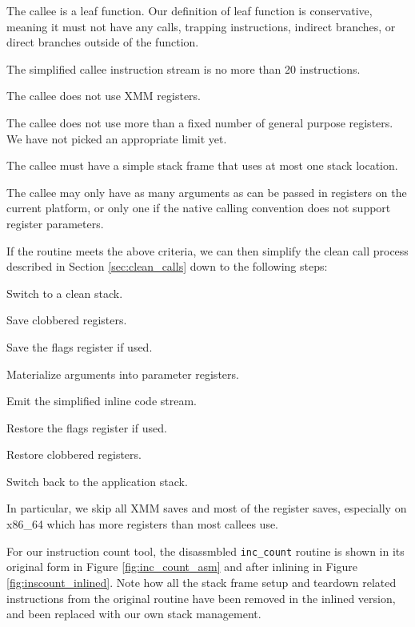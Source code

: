 \begin{packed_itemize}
\item The callee is a leaf function.  Our definition of leaf function is
conservative, meaning it must not have any calls, trapping instructions,
indirect branches, or direct branches outside of the function.
\item The simplified callee instruction stream is no more than 20 instructions.
\item The callee does not use XMM registers.
\item The callee does not use more than a fixed number of general purpose
registers.  We have not picked an appropriate limit yet.
\item The callee must have a simple stack frame that uses at most one stack
location.
\item The callee may only have as many arguments as can be passed in registers
on the current platform, or only one if the native calling convention does not
support register parameters.
\end{packed_itemize}

If the routine meets the above criteria, we can then simplify the clean call
process described in Section \ref{sec:clean_calls} down to the following steps:

\begin{packed_enumerate}
\item Switch to a clean stack.
\item Save clobbered registers.
\item Save the flags register if used.
\item Materialize arguments into parameter registers.
\item Emit the simplified inline code stream.
\item Restore the flags register if used.
\item Restore clobbered registers.
\item Switch back to the application stack.
\end{packed_enumerate}

In particular, we skip all XMM saves and most of the register saves, especially
on x86\_64 which has more registers than most callees use.

For our instruction count tool, the disassmbled {\tt inc\_count} routine is
shown in its original form in Figure \ref{fig:inc_count_asm} and after inlining
in Figure \ref{fig:inscount_inlined}.  Note how all the stack frame setup and
teardown related instructions from the original routine have been removed in the
inlined version, and been replaced with our own stack management.

